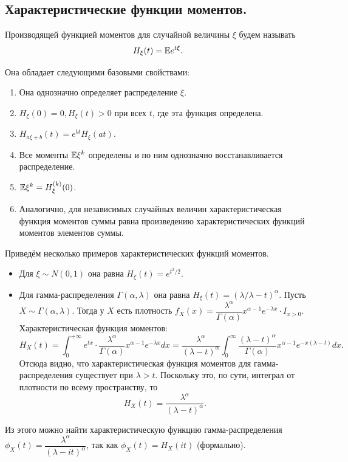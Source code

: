 \subsection{Характеристические функции моментов.}
\begin{definition}
    Производящей функцией моментов для случайной величины $\xi$ будем называть
    \[
        H_{\xi}(t) = \mathbb{E} e^{t\xi}.
    \]
\end{definition}
Она обладает следующими базовыми свойствами:
\begin{enumerate}
    \item Она однозначно определяет распределение $\xi$.
    \item $H_{\xi}(0) = 0, H_{\xi}(t) > 0$ при всех $t$, где эта функция определена.
    \item $H_{a\xi + b}(t) = e^{bt}H_{\xi}(at)$.
    \item Все моменты $\mathbb{E} \xi^k$ определены и по ним однозначно восстанавливается распределение.
    \item $\mathbb{E} \xi^k = H^{(k)}_\xi(0)$.
    \item Аналогично, для независимых случайных величин характеристическая функция моментов суммы равна произведению характеристических функций моментов элементов суммы.
\end{enumerate}
\begin{example}
    Приведём несколько примеров характеристических функций моментов.
    \begin{itemize}
        \item Для $\xi \sim N(0, 1)$ она равна $H_\xi(t) = e^{t^2/2}$.
        \item Для гамма-распределения $\Gamma(\alpha, \lambda)$ она равна $H_{\xi}(t) = (\lambda/\lambda - t)^\alpha$.
        Пусть $X \sim \Gamma(\alpha, \lambda)$. Тогда у $X$ есть плотность $f_X (x) = \dfrac{\lambda^\alpha}{\Gamma(\alpha)}x^{\alpha - 1}e^{-\lambda x} \cdot I_{x > 0}$.
        Характеристическая функция моментов:
        \[
            H_X(t) = \int_0^{+\infty} e^{tx} \cdot \dfrac{\lambda^\alpha}{\Gamma(\alpha)} x^{\alpha - 1}e^{-\lambda x} dx = \dfrac{\lambda^\alpha}{(\lambda - t)^\alpha} \int_0^{\infty} \dfrac{(\lambda - t)^\alpha}{\Gamma(\alpha)}x^{\alpha - 1} e^{-x(\lambda - t)}dx.
        \]
        Отсюда видно, что характеристическая функция моментов для гамма-распределения существует при $\lambda > t$.
        Поскольку это, по сути, интеграл от плотности по всему пространству, то
        \[
            H_X(t) = \dfrac{\lambda^\alpha}{(\lambda - t)^\alpha}.
        \]
    \end{itemize}
    \begin{note}
        Из этого можно найти характеристическую функцию гамма-распределения $\phi_X(t) = \dfrac{\lambda^\alpha}{(\lambda - it)^\alpha}$, так как $\phi_X(t) = H_X(it)$ (формально).
    \end{note}
\end{example}
